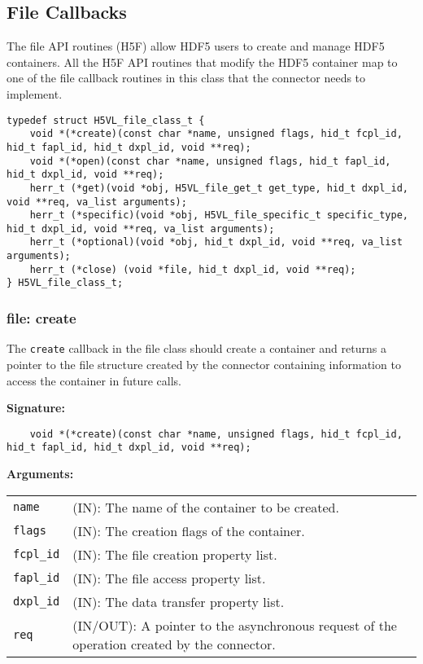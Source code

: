 

\subsection{File Callbacks}
The file API routines (H5F) allow HDF5 users to create and manage HDF5
containers. All the H5F API routines that modify the HDF5 container
map to one of the file callback routines in this class that the connector
needs to implement.

\begin{lstlisting}[caption={File class for file API routines, H5VLconnector.h}, captionpos=b, label={lst:Fileclass}]
typedef struct H5VL_file_class_t {                                               
    void *(*create)(const char *name, unsigned flags, hid_t fcpl_id, hid_t fapl_id, hid_t dxpl_id, void **req);                   
    void *(*open)(const char *name, unsigned flags, hid_t fapl_id, hid_t dxpl_id, void **req);
    herr_t (*get)(void *obj, H5VL_file_get_t get_type, hid_t dxpl_id, void **req, va_list arguments);
    herr_t (*specific)(void *obj, H5VL_file_specific_t specific_type, hid_t dxpl_id, void **req, va_list arguments);            
    herr_t (*optional)(void *obj, hid_t dxpl_id, void **req, va_list arguments);
    herr_t (*close) (void *file, hid_t dxpl_id, void **req);
} H5VL_file_class_t; 
\end{lstlisting}


\subsubsection{file: create}
The \texttt{create} callback in the file class should create a container
and returns a pointer to the file structure created by the connector containing information to
access the container in future calls.\medskip

\begin{mdframed}[style=bgbox]
\textbf{Signature:}
\begin{lstlisting}
    void *(*create)(const char *name, unsigned flags, hid_t fcpl_id, hid_t fapl_id, hid_t dxpl_id, void **req);
\end{lstlisting}

\textbf{Arguments:}\\
\begin{tabular}{l p{13.5cm}}
  \texttt{name} & (IN): The name of the container to be created.\\
  \texttt{flags} & (IN): The creation flags of the container.\\
  \texttt{fcpl\_id} & (IN): The file creation property list.\\
  \texttt{fapl\_id} & (IN): The file access property list.\\
  \texttt{dxpl\_id} & (IN): The data transfer property list.\\
  \texttt{req} & (IN/OUT): A pointer to the asynchronous request of the
  operation created by the connector.\\
\end{tabular}
\end{mdframed}

